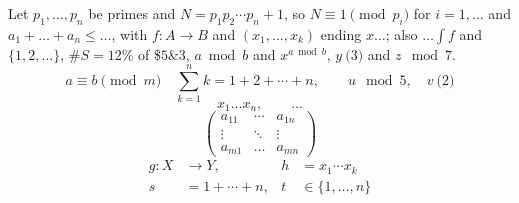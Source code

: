 \documentclass{article}
\begin{document}
Let $p_1,\dots,p_n$ be primes and $N = p_1p_2\cdots p_n + 1$, so $N\equiv 1 \pmod{p_i}$ for $i=1,\dots$
and $a_1+\dots+a_n\leq\dots$, with $f\colon A\to B$ and $(x_1,\ldots,x_k)$ ending $x\dots$; also $\dots\int f$
and $\{1,2,\dots\}$, $\#S = 12\%$ of $\$5 \& 3$, $a\bmod b$ and $x^{a\bmod b}$, $y\pod{3}$ and $z\mod{7}$.
\[ a \equiv b \pmod{m} \quad \sum_{k=1}^{n} k = 1+2+\cdots+n, \qquad u\mod{5}, \quad v\pod{2} \]
$$ x_1\dots x_n, \qquad \dots $$
\begin{equation}
  \begin{pmatrix} a_{11} & \cdots & a_{1n} \\ \vdots & \ddots & \vdots \\ a_{m1} & \dots & a_{mn} \end{pmatrix}
\end{equation}
\begin{align}
  g\colon X &\to Y, & h &= x_1\dotsm x_k \\
  s &= 1 + \dotsb + n, & t &\in \{1,\dotsc,n\}
\end{align}
\end{document}
